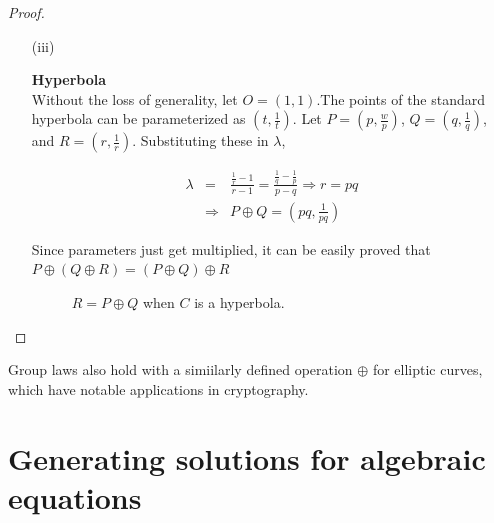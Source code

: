 \begin{proof}
\begin{itemize}
{      Since the parameters just get added, it can be easily proved that\\
      $P\oplus(Q\oplus R)=(P\oplus Q)\oplus R$
      }

    \item[(iii)]{\textbf{Hyperbola}\\
        Without the loss of generality, let $O=(1,1)$.The points of the standard hyperbola can be
        parameterized as $(t,\frac{1}{t})$. Let $P=(p,\frac{w}{p})$, $Q=(q,\frac{1}{q})$, and $R=(r,\frac{1}{r})$.
        Substituting these in $\lambda$,

        \begin{eqnarray*}
          \lambda&=&\frac{\frac{1}{r}-1}{r-1}=\frac{\frac{1}{q}-\frac{1}{p}}{p-q} \Rightarrow r=pq\\
                 &\Rightarrow&P\oplus Q=(pq,\frac{1}{pq})
        \end{eqnarray*}

        Since parameters just get multiplied, it can be easily proved that\\
        $P\oplus(Q\oplus R)=(P\oplus Q)\oplus R$

        \begin{figure}[H]
          \center
          \caption{$R = P \oplus Q$ when $C$ is a hyperbola.}
        \end{figure}
      }

  \end{itemize}
\end{proof}

Group laws also hold with a simiilarly defined operation $\oplus$ for elliptic curves, which have notable
applications in cryptography.

\section{Generating solutions for algebraic equations}
